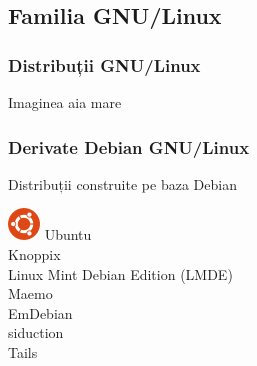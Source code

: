 \documentclass[xcolor=dvipsnames]{beamer}
\begin{document}
%
\subsection{Familia GNU/Linux}
\begin{frame}
\frametitle{Distribuții GNU/Linux}
\begin{block}
{Imaginea aia mare}
\end{block}
\end{frame}

\begin{frame}
\frametitle{Derivate Debian GNU/Linux}
\begin{block}
{Distribuții construite pe baza Debian}

\includegraphics[scale=0.4]{../images/logos/ubuntu_s.png} Ubuntu\\
Knoppix\\
Linux Mint Debian Edition (LMDE)\\
Maemo\\
EmDebian\\
siduction\\
Tails
\end{block}
\end{frame}

%
\end{document}
